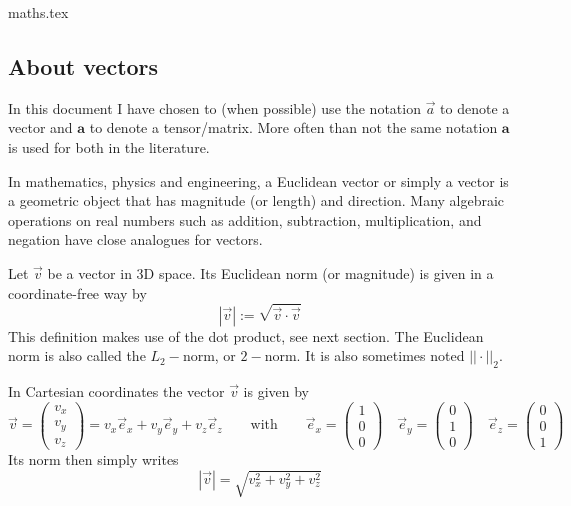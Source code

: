 \begin{flushright} {\tiny {\color{gray} maths.tex}} \end{flushright}

\subsection{About vectors}

\begin{remark}
In this document I have chosen to (when possible) use the notation $\vec{a}$
to denote a vector and ${\bm a}$ to denote a tensor/matrix. More often than not 
the same notation ${\bm a}$ is used for both in the literature.
\end{remark}

In mathematics, physics and engineering, a Euclidean vector or simply a vector 
is a geometric object that has magnitude (or length) and direction. 
Many algebraic operations on real numbers such as addition, subtraction, multiplication, 
and negation have close analogues for vectors.

Let $\vec{v}$ be a vector in 3D space. 
Its Euclidean norm (or magnitude) is given in a coordinate-free way by 
\[
|\vec{v}|:=\sqrt{\vec{v}\cdot\vec{v}}
\]
This definition makes use of the dot product, see next section.
The Euclidean norm is also called the $L_2-$norm, or $2-$norm. It is also 
sometimes noted $||\cdot ||_2$. 

In Cartesian coordinates the vector $\vec{v}$ is given by
\[
\vec{v}=
\left(
\begin{array}{c}
v_x \\ v_y \\ v_z
\end{array}
\right)
=
v_x \vec{e}_x + 
v_y \vec{e}_y + 
v_z \vec{e}_z 
\qquad
\text{with}
\qquad
\vec{e}_x=
\left(
\begin{array}{c}
1 \\ 0 \\ 0
\end{array}
\right)
\quad
\vec{e}_y=
\left(
\begin{array}{c}
0 \\ 1 \\ 0
\end{array}
\right)
\quad
\vec{e}_z=
\left(
\begin{array}{c}
0 \\ 0 \\ 1
\end{array}
\right)
\]
Its norm then simply writes
\[
|\vec{v}| = \sqrt{v_x^2 + v_y^2 + v_z^2}
\]


